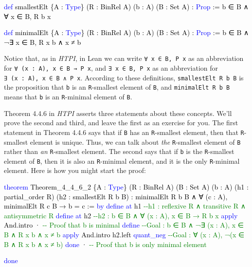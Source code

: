 \documentclass[
  letterpaper,
  DIV=11,
  numbers=noendperiod]{scrreprt}
\makeatletter
\newenvironment{Shaded}{\begin{snugshade}}{\end{snugshade}}
\newcommand{\CommentTok}[1]{\textcolor[rgb]{0.37,0.37,0.37}{#1}}
\newcommand{\ErrorTok}[1]{\textcolor[rgb]{0.68,0.00,0.00}{#1}}
\newcommand{\KeywordTok}[1]{\textcolor[rgb]{0.00,0.23,0.31}{#1}}
\newcommand{\NormalTok}[1]{\textcolor[rgb]{0.00,0.23,0.31}{#1}}
\newcommand{\SpecialCharTok}[1]{\textcolor[rgb]{0.37,0.37,0.37}{#1}}
\newcommand{\WarningTok}[1]{\textcolor[rgb]{0.37,0.37,0.37}{\textit{#1}}}
\def\redsquiggly{\bgroup \markoverwith{\textcolor{red}{\lower3.5\p@\hbox{\sixly \char58}}}\ULon}
\renewcommand{\NormalTok}[1]{\textcolor[HTML]{000000}{#1}}
\renewcommand{\KeywordTok}[1]{\textcolor[HTML]{0000FF}{#1}}
\renewcommand{\SpecialCharTok}[1]{}
\renewcommand{\ErrorTok}[1]{\redsquiggly{#1}}
\renewcommand{\WarningTok}[1]{\redsquiggly{\textcolor[HTML]{0000FF}{#1}}}
\renewcommand{\CommentTok}[1]{\textcolor[HTML]{008000}{#1}}
\theoremstyle{remark}
\makeatother
\begin{document}
\begin{Shaded}
\begin{Highlighting}[]
\KeywordTok{def}\NormalTok{ smallestElt \{A : }\KeywordTok{Type}\NormalTok{\} (R : BinRel A) (b : A) (B : Set A) : }\KeywordTok{Prop}\NormalTok{ :=}
\NormalTok{  b ∈ B ∧ ∀ x ∈ B, R b x}

\KeywordTok{def}\NormalTok{ minimalElt \{A : }\KeywordTok{Type}\NormalTok{\} (R : BinRel A) (b : A) (B : Set A) : }\KeywordTok{Prop}\NormalTok{ :=}
\NormalTok{  b ∈ B ∧ ¬∃ x ∈ B, R x b ∧ x ≠ b}
\end{Highlighting}
\end{Shaded}

Notice that, as in \emph{HTPI}, in Lean we can write
\texttt{∀\ x\ ∈\ B,\ P\ x} as an abbreviation for
\texttt{∀\ (x\ :\ A),\ x\ ∈\ B\ →\ P\ x}, and \texttt{∃\ x\ ∈\ B,\ P\ x}
as an abbreviation for \texttt{∃\ (x\ :\ A),\ x\ ∈\ B\ ∧\ P\ x}.
According to these definitions, \texttt{smallestElt\ R\ b\ B} is the
proposition that \texttt{b} is an \texttt{R}-smallest element of
\texttt{B}, and \texttt{minimalElt\ R\ b\ B} means that \texttt{b} is an
\texttt{R}-minimal element of \texttt{B}.

Theorem 4.4.6 in \emph{HTPI} asserts three statements about these
concepts. We'll prove the second and third, and leave the first as an
exercise for you. The first statement in Theorem 4.4.6 says that if
\texttt{B} has an \texttt{R}-smallest element, then that
\texttt{R}-smallest element is unique. Thus, we can talk about
\emph{the} \texttt{R}-smallest element of \texttt{B} rather than
\emph{an} \texttt{R}-smallest element. The second says that if
\texttt{b} is the \texttt{R}-smallest element of \texttt{B}, then it is
also an \texttt{R}-minimal element, and it is the only
\texttt{R}-minimal element. Here is how you might start the proof:

\begin{Shaded}
\begin{Highlighting}[]
\KeywordTok{theorem}\NormalTok{ Theorem\_4\_4\_6\_2 \{A : }\KeywordTok{Type}\NormalTok{\} (R : BinRel A) (B : Set A) (b : A)}
\NormalTok{    (h1 : partial\_order R) (h2 : smallestElt R b B) :}
\NormalTok{    minimalElt R b B ∧ ∀ (c : A), minimalElt R c B → b = c := }\KeywordTok{by}
  \KeywordTok{define} \KeywordTok{at}\NormalTok{ h1     }\CommentTok{{-}{-}h1 : reflexive R ∧ transitive R ∧ antisymmetric R}
  \KeywordTok{define} \KeywordTok{at}\NormalTok{ h2     }\CommentTok{{-}{-}h2 : b ∈ B ∧ ∀ (x : A), x ∈ B → R b x}
  \KeywordTok{apply}\NormalTok{ And.intro}
\NormalTok{  · }\CommentTok{{-}{-} Proof that b is minimal}
    \KeywordTok{define}           \CommentTok{{-}{-}Goal : b ∈ B ∧ ¬∃ (x : A), x ∈ B ∧ R x b ∧ x ≠ b}
    \KeywordTok{apply}\NormalTok{ And.intro h2.left}
    \KeywordTok{quant\_neg}        \CommentTok{{-}{-}Goal : ∀ (x : A), ¬(x ∈ B ∧ R x b ∧ x ≠ b)}
    \SpecialCharTok{**}\WarningTok{demorgan}\ErrorTok{ : ¬(x ∈ B ∧ R x b ∧ x ≠ b)}\SpecialCharTok{::}
    \KeywordTok{done}
\NormalTok{  · }\CommentTok{{-}{-} Proof that b is only minimal element}

    \SpecialCharTok{**}\WarningTok{done}\SpecialCharTok{::}
  \KeywordTok{done}
\end{Highlighting}
\end{Shaded}
\end{document}
